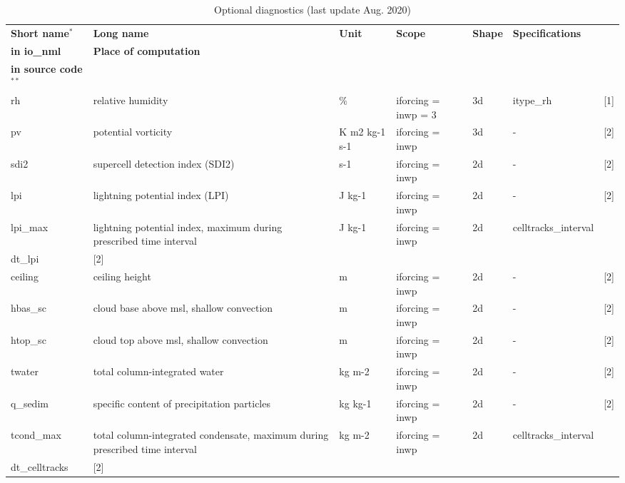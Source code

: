\renewcommand*{\arraystretch}{1.2}
\begin{longtable}
{|>{\raggedright}p{}  %
|>{\raggedright}p{}   %
|>{\raggedright}p{}   %
|>{\raggedright}p{}    %
|>{\raggedright}p{}   %
|>{\raggedright}p{}   %
|>{\raggedright}p{}|} %
\caption{Optional diagnostics (last update Aug. 2020)}\label{tab:optionaldiagnostics}\\
\hline
\textbf{Short name}${}^\ast$ & \textbf{Long name} & \textbf{Unit} & \textbf{Scope} & \textbf{Shape} & 
\textbf{Specifications}\\\textbf{in io\_nml} & \textbf{Place of computation} \\ \textbf{in source code}${}^{\ast\ast}$
\tabularnewline
\hline
\endhead

rh & relative humidity & \% & iforcing = inwp = 3 & 3d & itype\_rh & [1]
\tabularnewline
%

pv & potential vorticity & K m2 kg-1 s-1 & iforcing = inwp & 3d & - & [2]
\tabularnewline
%

sdi2 & supercell detection index (SDI2) & s-1 & iforcing = inwp & 2d & - & [2]
\tabularnewline
%

lpi & lightning potential index (LPI) & J kg-1 & iforcing = inwp & 2d & - & [2]
\tabularnewline
%

lpi\_max & lightning potential index, maximum during prescribed time interval & J kg-1 & iforcing = inwp & 2d &
celltracks\_interval \\ dt\_lpi & [2]
\tabularnewline
%

ceiling & ceiling height & m & iforcing = inwp & 2d & - &  [2]
\tabularnewline
%

hbas\_sc & cloud base above msl, shallow convection & m & iforcing = inwp & 2d & - & [2]
\tabularnewline
%

htop\_sc & cloud top above msl, shallow convection & m & iforcing = inwp & 2d & - & [2]
\tabularnewline
%

twater & total column-integrated water & kg m-2 & iforcing = inwp & 2d & - & [2]
\tabularnewline
%

q\_sedim & specific content of precipitation particles & kg kg-1 & iforcing = inwp & 2d & - & [2]
\tabularnewline
%

tcond\_max & total column-integrated condensate, maximum during prescribed time interval & 
kg m-2 & iforcing = inwp & 2d & celltracks\_interval \\ dt\_celltracks & [2]
\tabularnewline
%


\end{longtable}
